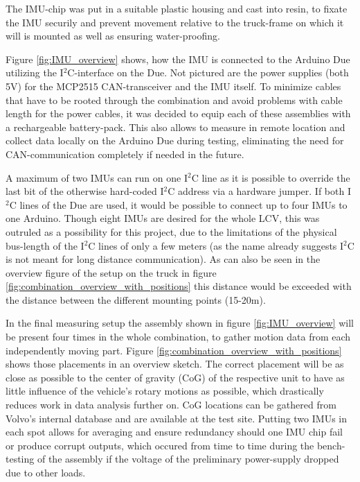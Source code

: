 \documentclass[ExampleMasters.tex]{subfiles}
\begin{document}
The IMU-chip was put in a suitable plastic housing and cast into resin, to fixate the IMU securily and prevent movement relative to the truck-frame on which it will is mounted as well as ensuring water-proofing.

Figure \ref{fig:IMU_overview} shows, how the IMU is connected to the Arduino Due utilizing the I$^{2}$C-interface on the Due. Not pictured are the power supplies (both 5V) for the MCP2515 CAN-transceiver and the IMU itself. To minimize cables that have to be rooted through the combination and avoid problems with cable length for the power cables, it was decided to equip each of these assemblies with a rechargeable battery-pack. This also allows to measure in remote location and collect data locally on the Arduino Due during testing, eliminating the need for CAN-communication completely if needed in the future.

A maximum of two IMUs can run on one I$^{2}$C line as it is possible to override the last bit of the otherwise hard-coded I$^{2}$C address via a hardware jumper. If both I$^{2}$C lines of the Due are used, it would be possible to connect up to four IMUs to one Arduino. Though eight IMUs are desired for the whole LCV, this was outruled as a possibility for this project, due to the limitations of the physical bus-length of the I$^{2}$C lines of only a few meters (as the name already suggests I$^{2}$C is not meant for long distance communication). As can also be seen in the overview figure of the setup on the truck in figure \ref{fig:combination_overview_with_positions} this distance would be exceeded with the distance between the different mounting points (15-20m).

In the final measuring setup the assembly shown in figure \ref{fig:IMU_overview} will be present four times in the whole combination, to gather motion data from each independently moving part. Figure \ref{fig:combination_overview_with_positions} shows those placements in an overview sketch. The correct placement will be as close as possible to the center of gravity (CoG) of the respective unit to have as little influence of the vehicle's rotary motions as possible, which drastically reduces work in  data analysis further on. CoG locations can be gathered from Volvo's internal database and are available at the test site. Putting two IMUs in each spot allows for averaging and ensure redundancy should one IMU chip fail or produce corrupt outputs, which occured from time to time during the bench-testing of the assembly if the voltage of the preliminary power-supply dropped due to other loads.
\end{document}
